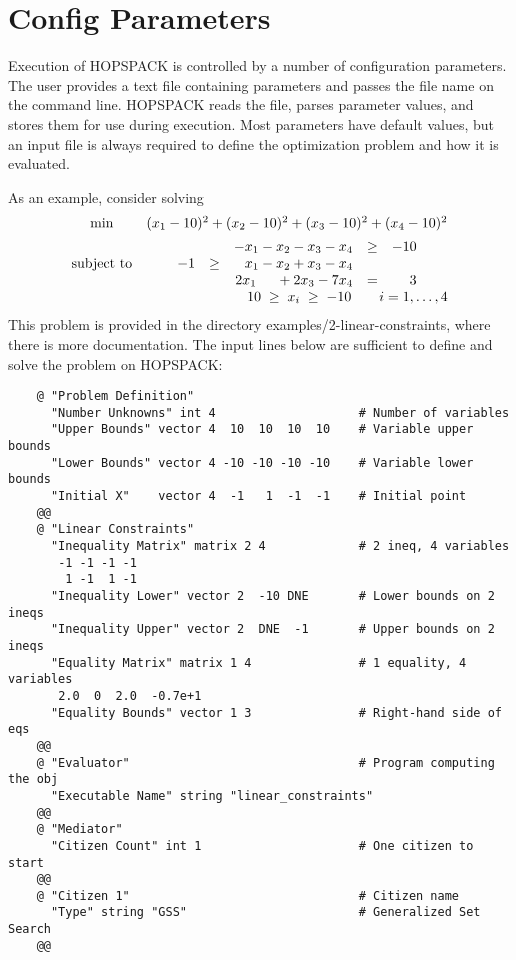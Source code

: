 \section{Config Parameters}
\label{sec:params}

Execution of HOPSPACK is controlled by a number of configuration parameters.
The user provides a text file containing parameters and passes the file name
on the command line.  HOPSPACK reads the file, parses parameter values,
and stores them for use during execution.
Most parameters have default values, but an input file is always required
to define the optimization problem and how it is evaluated.

As an example, consider solving
\[
  \begin{array}{cc}
    \min
      & (x_1 - 10)^2 + (x_2 - 10)^2 + (x_3 - 10)^2 + (x_4 - 10)^2  \\
    \vspace{-0.1in}  \\
    \mbox{subject to}
      & \begin{array}{rcrcr}
              &      & -x_1 - x_2 - x_3 - x_4 & \geq & -10    \\
           -1 & \geq &  x_1 - x_2 + x_3 - x_4                 \\
              &      & 2x_1 \hspace{5mm} +2x_3 -7x_4 & =    &  3  \\
      \end{array}  \\
      & \hspace{1.0in}
        10 \; \geq \; x_i \; \geq \; -10  \qquad i = 1, \ldots, 4
  \end{array}
\]
This problem is provided in the directory {\sf examples/2-linear-constraints},
where there is more documentation.
The input lines below are sufficient to define and solve the problem on HOPSPACK:
\begin{verbatim}
    @ "Problem Definition"
      "Number Unknowns" int 4                    # Number of variables
      "Upper Bounds" vector 4  10  10  10  10    # Variable upper bounds
      "Lower Bounds" vector 4 -10 -10 -10 -10    # Variable lower bounds
      "Initial X"    vector 4  -1   1  -1  -1    # Initial point
    @@
    @ "Linear Constraints"
      "Inequality Matrix" matrix 2 4             # 2 ineq, 4 variables
       -1 -1 -1 -1
        1 -1  1 -1
      "Inequality Lower" vector 2  -10 DNE       # Lower bounds on 2 ineqs
      "Inequality Upper" vector 2  DNE  -1       # Upper bounds on 2 ineqs
      "Equality Matrix" matrix 1 4               # 1 equality, 4 variables
       2.0  0  2.0  -0.7e+1
      "Equality Bounds" vector 1 3               # Right-hand side of eqs
    @@
    @ "Evaluator"                                # Program computing the obj
      "Executable Name" string "linear_constraints"
    @@
    @ "Mediator" 
      "Citizen Count" int 1                      # One citizen to start
    @@
    @ "Citizen 1"                                # Citizen name
      "Type" string "GSS"                        # Generalized Set Search
    @@
\end{verbatim}

